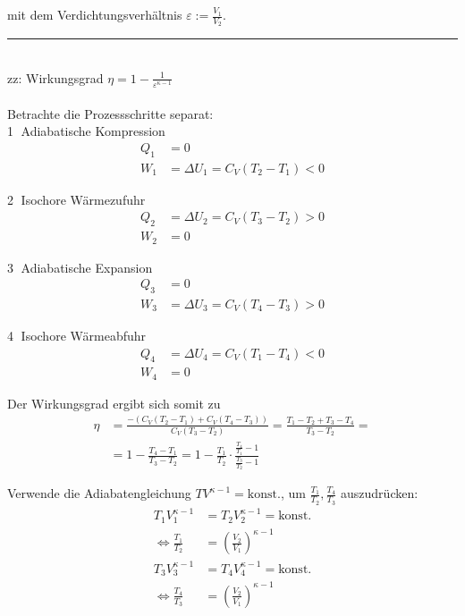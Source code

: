 \documentclass{article}
\newcommand{\lr}[1]{\left(#1\right)}
\begin{document}
mit dem Verdichtungsverhältnis $\varepsilon := \frac{V_1}{V_2}$.


\newpage


{\color{violet}
\hrule
	\\
	zz: Wirkungsgrad $\eta = 1 - \frac{1}{\varepsilon^{\kappa-1}}$\\
	\\
	Betrachte die Prozessschritte separat:\\
	\textcircled{1} Adiabatische Kompression
		\begin{align*}
			Q_1 &= 0 \\
			W_1 &= \Delta U_1 = C_V(T_2 - T_1) < 0
		\end{align*}
	
	\textcircled{2} Isochore Wärmezufuhr
		\begin{align*}
			Q_2 &= \Delta U_2 = C_V(T_3 - T_2) > 0 \\
			W_2 &= 0
		\end{align*}
	
	\textcircled{3} Adiabatische Expansion
		\begin{align*}
			Q_3 &= 0 \\
			W_3 &= \Delta U_3 = C_V(T_4 - T_3) > 0
		\end{align*}
	
	\textcircled{4} Isochore Wärmeabfuhr
		\begin{align*}
			Q_4 &= \Delta U_4 = C_V(T_1 - T_4) < 0 \\
			W_4 &= 0
		\end{align*}

	Der Wirkungsgrad ergibt sich somit zu
		\begin{align*}
			\eta &= \frac{-(C_V(T_2 - T_1) + C_V(T_4 - T_3))}{C_V(T_3 - T_2)} = \frac{T_1 - T_2 + T_3 - T_4}{T_3 - T_2} = \\
			&= 1 - \frac{T_4 - T_1}{T_3 - T_2} = 1 - \frac{T_1}{T_2} \cdot \frac{\frac{T_4}{T_1} - 1}{ \frac{T_3}{T_2} - 1 }
		\end{align*}

	Verwende die Adiabatengleichung $TV^{\kappa-1}=\text{konst.}$, um $\frac{T_1}{T_2}, \frac{T_4}{T_3}$ auszudrücken:
		\begin{align*}
			T_1 V_1^{\kappa-1} &= T_2 V_2^{\kappa-1} = \text{konst.} \\
			\Leftrightarrow \frac{T_1}{T_2} &= \lr{ \frac{V_2}{V_1} }^{\kappa-1} \\
			T_3 V_3^{\kappa-1} &= T_4 V_4^{\kappa-1} = \text{konst.} \\
			\Leftrightarrow \frac{T_4}{T_3} &= \lr{ \frac{V_2}{V_1} }^{\kappa-1}
		\end{align*}
	
}
\end{document}
